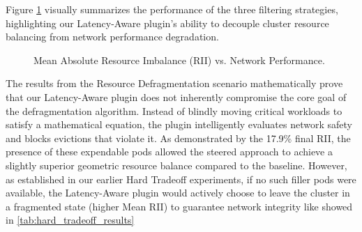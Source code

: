 Figure \ref{fig:resourcedefrag_latency} visually summarizes the performance of the three filtering strategies, highlighting our Latency-Aware plugin's ability to decouple cluster resource balancing from network performance degradation.
\begin{figure}[H]
    \centering
    \caption{Mean Absolute Resource Imbalance (RII) vs. Network Performance.}
    \label{fig:resourcedefrag_latency}
\end{figure}

The results from the Resource Defragmentation scenario mathematically prove that our Latency-Aware plugin does not inherently compromise the core goal of the defragmentation algorithm. Instead of blindly moving critical workloads to satisfy a mathematical equation, the plugin intelligently evaluates network safety and blocks evictions that violate it. As demonstrated by the 17.9\% final RII, the presence of these expendable pods allowed the steered approach to achieve a slightly superior geometric resource balance compared to the baseline. However, as established in our earlier Hard Tradeoff experiments, if no such filler pods were available, the Latency-Aware plugin would actively choose to leave the cluster in a fragmented state (higher Mean RII) to guarantee network integrity like showed in \ref{tab:hard_tradeoff_results}
